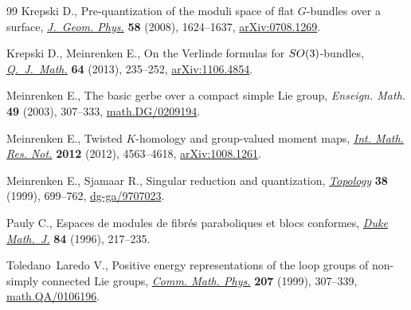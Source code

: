 \documentclass[11pt]{article}
\numberwithin{equation}{section}
\begin{document}
\begin{thebibliography}{99}
Krepski D., Pre-quantization of the moduli space of f\/lat {$G$}-bundles over a
  surface, \href{http://dx.doi.org/10.1016/j.geomphys.2008.07.009}{\textit{J.~Geom. Phys.}} \textbf{58} (2008), 1624--1637,
  \href{http://arxiv.org/abs/0708.1269}{arXiv:0708.1269}.

Krepski D., Meinrenken E., On the {V}erlinde formulas for {${\rm
  SO}(3)$}-bundles, \href{http://dx.doi.org/10.1093/qmath/har040}{\textit{Q.~J.~Math.}} \textbf{64} (2013), 235--252,
  \href{http://arxiv.org/abs/1106.4854}{arXiv:1106.4854}.

Meinrenken E., The basic gerbe over a compact simple {L}ie group,
  \textit{Enseign. Math.} \textbf{49} (2003), 307--333,
  \href{http://arxiv.org/abs/math.DG/0209194}{math.DG/0209194}.

Meinrenken E., Twisted {$K$}-homology and group-valued moment maps,
  \href{http://dx.doi.org/10.1093/imrn/rnr197}{\textit{Int. Math. Res. Not.}} \textbf{2012} (2012), 4563--4618, \href{http://arxiv.org/abs/1008.1261}{arXiv:1008.1261}.

Meinrenken E., Sjamaar R., Singular reduction and quantization,
  \href{http://dx.doi.org/10.1016/S0040-9383(98)00012-3}{\textit{Topology}} \textbf{38} (1999), 699--762, \mbox{\href{http://arxiv.org/abs/dg-ga/9707023}{dg-ga/9707023}}.

Pauly C., Espaces de modules de f\/ibr\'es paraboliques et blocs conformes,
  \href{http://dx.doi.org/10.1215/S0012-7094-96-08408-2}{\textit{Duke Math.~J.}} \textbf{84} (1996), 217--235.

Toledano~Laredo V., Positive energy representations of the loop groups of
  non-simply connected {L}ie groups, \href{http://dx.doi.org/10.1007/s002200050728}{\textit{Comm. Math. Phys.}} \textbf{207}
  (1999), 307--339, \href{http://arxiv.org/abs/math.QA/0106196}{math.QA/0106196}.

\end{thebibliography}
\end{document}
